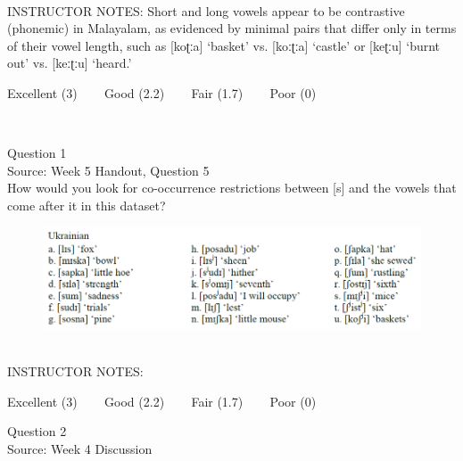 \documentclass[12pt]{article}
\begin{document}
~\\
INSTRUCTOR NOTES: Short and long vowels appear to be contrastive (phonemic) in Malayalam, as evidenced by minimal pairs that differ only in terms of their vowel length, such as [koʈːa] ‘basket’ vs. [koːʈːa] ‘castle’ or [keʈːu] ‘burnt out’ vs. [keːʈːu] ‘heard.’


\vfill
Excellent (3) ~~~ Good (2.2) ~~~ Fair (1.7) ~~~ Poor (0)
\newpage

\begin{center}
\textbf{{\color{red}{\HUGE END OF EXAM}}}\\

\end{center}
\newpage

\begin{center}
\textbf{{\color{blue}{\HUGE START OF EXAM\\}}}

\textbf{{\color{blue}{\HUGE Student ID: 99999\\}}}

\textbf{{\color{blue}{\HUGE \\}}}

\end{center}
\newpage

{\large Question 1}\\

Source: Week 5 Handout, Question 5\\

How would you look for co-occurrence restrictions between [s] and the vowels that come after it in this dataset?\\

\begin{figure}[H]
\includegraphics{../images/ukrainian.png}
\end{figure}

~\\
INSTRUCTOR NOTES: 


\vfill
Excellent (3) ~~~ Good (2.2) ~~~ Fair (1.7) ~~~ Poor (0)
\newpage

{\large Question 2}\\

Source: Week 4 Discussion\\
\end{document}
